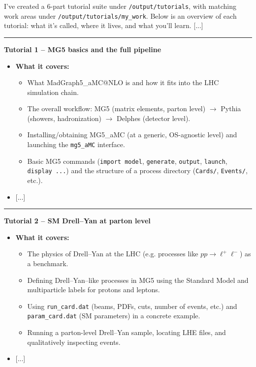 \documentclass[submission, Phys]{SciPost}
\begin{document}
\begin{promptblock}[\ma (shortened)]
I’ve created a 6-part tutorial suite under \lstinline|/output/tutorials|, with matching work areas under \lstinline|/output/tutorials/my_work|. Below is an overview of each tutorial: what it’s called, where it lives, and what you’ll learn. [...]

\vspace{1em}
\hrule
\vspace{1em}

\textbf{Tutorial 1 – MG5 basics and the full pipeline}
\begin{itemize}
 \item \textbf{What it covers:}
 \begin{itemize}
 \item What MadGraph5\_aMC@NLO is and how it fits into the LHC simulation chain.
 \item The overall workflow: MG5 (matrix elements, parton level) $\to$ Pythia (showers, hadronization) $\to$ Delphes (detector level).
 \item Installing/obtaining MG5\_aMC (at a generic, OS-agnostic level) and launching the \lstinline|mg5_aMC| interface.
 \item Basic MG5 commands (\lstinline|import model|, \lstinline|generate|, \lstinline|output|, \lstinline|launch|, \lstinline|display ...|) and the structure of a process directory (\lstinline|Cards/|, \lstinline|Events/|, etc.).
  \end{itemize}
\item {[...]}
\end{itemize}

\vspace{1em}
\hrule
\vspace{1em}

\textbf{Tutorial 2 – SM Drell–Yan at parton level}
\begin{itemize}
 \item \textbf{What it covers:}
\begin{itemize}
\item The physics of Drell–Yan at the LHC (e.g. processes like $pp \to \ell^+\ell^-$) as a benchmark.
\item Defining Drell–Yan–like processes in MG5 using the Standard Model and multiparticle labels for protons and leptons.
\item Using \lstinline|run_card.dat| (beams, PDFs, cuts, number of events, etc.) and \lstinline|param_card.dat| (SM parameters) in a concrete example.
\item Running a parton-level Drell–Yan sample, locating LHE files, and qualitatively inspecting events.
\end{itemize}
\item {[...]}


\end{itemize}
\end{promptblock}
\end{document}
